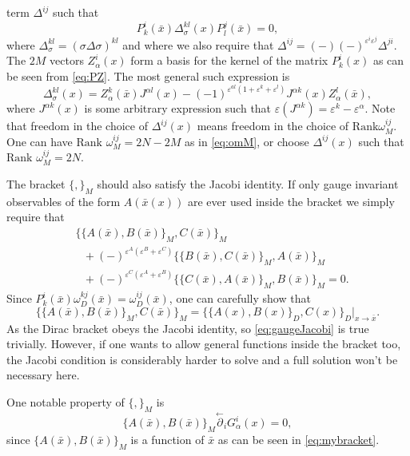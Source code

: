 \documentclass[a4paper,12pt]{article}
\theoremstyle{definition}
\theoremstyle{remark}
\numberwithin{equation}{section}
\newcommand{\al}{\alpha}
\newcommand{\om}{\omega}
\newcommand{\si}{\sigma}
\newcommand{\De}{\Delta}
\newcommand{\eps}{\varepsilon}
\newcommand{\ra}{\rightarrow}
\newcommand{\bx}{\bar{x}}
\newcommand{\pl}{\overset{\leftarrow}{\partial}}
\begin{document}
term $\De^{ij}$ such that
\begin{equation}
P^i_k(\bx)\De^{kl}_{\si}(x)P_l^j(\bx)=0,
\end{equation}
where $\De_{\si}^{kl}=(\si\De\si)^{kl}$ and where we also require
that $\De^{ij}=(-)(-)^{\eps^i\eps^j}\De^{ji}$. The $2M$ vectors
$Z_{\al}^i(x)$ form a basis for the kernel of the matrix
$P^i_k(x)$ as can be seen from \eqref{eq:PZ}. The most general
such expression is
\begin{equation}
\De_{\si}^{kl}(x)=Z^k_{\al}(\bx)J^{\al l}(x)
-(-1)^{\eps^{al}(1+\eps^k + \eps^l)} J^{\al k}(x)Z^l_{\al}(\bx),
\end{equation}
where $J^{\al k}(x)$ is some arbitrary expression such that
$\eps(J^{\al k})=\eps^k-\eps^{\al}$. Note that freedom in the
choice of $\De^{ij}(x)$ means freedom in the choice of $\text{Rank
} \om_M^{ij}$. One can have $\text{Rank } \om_M^{ij}=2N-2M$ as in
\eqref{eq:omM}, or choose $\De^{ij}(x)$ such that $\text{Rank }
\om_M^{ij}=2N$.

The bracket $\{,\}_M$ should also satisfy the Jacobi identity. If
only gauge invariant observables of the form $A(\bx(x))$ are ever
used inside the bracket we simply require that
\begin{equation}\label{eq:gaugeJacobi}
\begin{split}
&\{\{A(\bx),B(\bx)\}_M,C(\bx)\}_M\\
&\text{  }+(-)^{\eps^A(\eps^B+\eps^C)}\{\{B(\bx),C(\bx)\}_M,A(\bx)\}_M \\
&\text{  }
+(-)^{\eps^C(\eps^A+\eps^B)}\{\{C(\bx),A(\bx)\}_M,B(\bx)\}_M=0.
\end{split}
\end{equation}
Since $P^i_k(\bx)\om_D^{kj}(\bx)=\om_D^{ij}(\bx)$, one can
carefully show that
\begin{equation}
\{\{A(\bx),B(\bx)\}_M,C(\bx)\}_M=\{\{A(x),B(x)\}_D,C(x)\}_D|_{x \ra
\bx}.
\end{equation}
As the Dirac bracket obeys the Jacobi identity, so
\eqref{eq:gaugeJacobi} is true trivially. However, if one wants to
allow general functions inside the bracket too, the Jacobi
condition is considerably harder to solve and a full solution
won't be necessary here.

One notable property of $\{,\}_M$ is
\begin{equation}
\{A(\bx),B(\bx)\}_M \pl_i G^i_{\al}(x)=0,
\end{equation}
since $\{A(\bx),B(\bx)\}_M$ is a function of $\bx$ as can be seen
in \eqref{eq:mybracket}.
\end{document}
